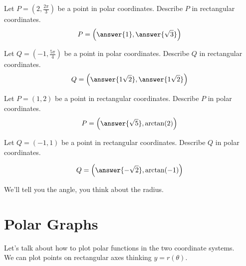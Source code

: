 \documentclass{ximera}
\begin{document}
\begin{question}
  Let $P=\left( 2,\frac{2\pi}{3} \right)$ be a point in polar coordinates. Describe $P$ in
  rectangular coordinates.
    \[
    P = \left( \answer{1}, \answer{\sqrt{3}} \right)
    \]
\end{question}

  \begin{question}
  Let $Q=(-1,\frac{5\pi}{4})$ be a point in polar coordinates. Describe $Q$ in
  rectangular coordinates.
    \[
    Q = \left( \answer{1\sqrt{2}}, \answer{1\sqrt{2}} \right)
    \]
\end{question}


\begin{question}
  Let $P=(1,2)$ be a point in rectangular coordinates. Describe $P$ in
  polar coordinates.
    \[
    P = \left( \answer{\sqrt{5}}, \arctan(2) \right)
    \]
\end{question}


  \begin{question}
  Let $Q=(-1,1)$ be a point in rectangular coordinates. Describe $Q$ in
  polar coordinates.

    \[
    Q = \left( \answer{-\sqrt{2}}, \arctan(-1) \right)
    \]
    \begin{hint}
      We'll tell you the angle, you think about the radius.
    \end{hint}
\end{question}



















\section*{Polar Graphs}

Let's talk about how to plot polar functions in the two coordinate systems.  \\


We can plot points on rectangular axes thinking $y = r(\theta)$. 
\end{document}
